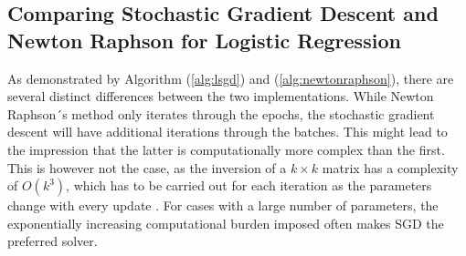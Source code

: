 \documentclass
[twocolumn,
secnumarabic,
nobibnotes,
aps,
prl,
reprint,
groupedaddress,
amsmath,
amssymb
]{revtex4-2}
\begin{document}
\subsection{Comparing Stochastic Gradient Descent and Newton Raphson for Logistic Regression}
As demonstrated by Algorithm (\ref{alg:lsgd}) and (\ref{alg:newtonraphson}), there are several distinct differences between the two implementations. While Newton Raphson´s method only iterates through the epochs, the stochastic gradient descent will have additional iterations through the batches. This might lead to the impression that the latter is computationally more complex than the first. This is however not the case, as the inversion of a $k \times k$ matrix has a complexity of $O(k^3)$, which has to be carried out for each iteration as the parameters change with every update \cite{Goodfellow2016}. For cases with a large number of parameters, the exponentially increasing computational burden imposed often makes SGD the preferred solver.
\end{document}
